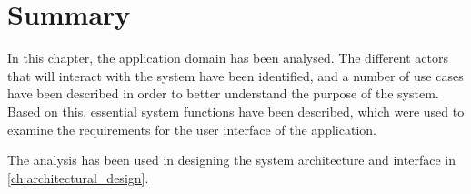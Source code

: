 \section{Summary} \label{ssc:ad_summary}
In this chapter, the application domain has been analysed. The different actors that will interact with the system have been identified, and a number of use cases have been described in order to better understand the purpose of the system. Based on this, essential system functions have been described, which were used to examine the requirements for the user interface of the application. 
\par
The analysis has been used in designing the system architecture and interface in \autoref{ch:architectural_design}.